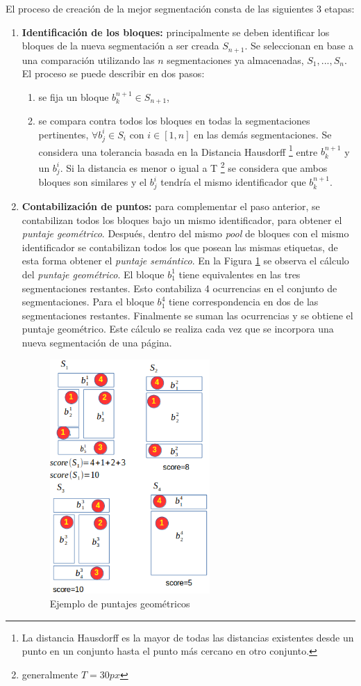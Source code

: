 \documentclass[10pt]{revecom}
\begin{document}
El proceso de creación de la mejor segmentación consta de las siguientes 3 etapas: 
\begin{enumerate}
\item \textbf{Identificación de los bloques:} principalmente se deben identificar los bloques de la nueva segmentación a ser creada $S_{n+1}$. Se seleccionan en base a una comparación utilizando las $n$ segmentaciones ya almacenadas, $S_{1},...,S_{n} $. 
El proceso se puede describir en dos pasos: 
\begin{enumerate}
\item se fija un bloque $b_{k}^{n+1} \in S_{n+1}$, 
\item se compara contra todos los bloques en todas la segmentaciones pertinentes, $\forall b_{j}^{i} \in S_i$ con $i \in [1,n]$ en las demás segmentaciones. 
Se considera una tolerancia basada en la Distancia Hausdorff \footnote{La distancia Hausdorff es la mayor de todas las distancias existentes desde un punto en un conjunto hasta el punto más cercano en otro conjunto.} entre $b_{k}^{n+1}$ y un $b_{j}^{i} $. 
Si la distancia es menor o igual a T \footnote{generalmente $T=30px$} se considera que ambos bloques son similares y el $b_{j}^{i}$  tendría el mismo identificador que $b_{k}^{n+1}$.  
 \end{enumerate}
\item \textbf{Contabilización de puntos:} para complementar el paso anterior, se contabilizan todos los bloques bajo un mismo identificador, para obtener el \textit{puntaje geométrico}. Después, dentro del mismo \textit{pool} de bloques con el mismo identificador se contabilizan todos los que posean las mismas etiquetas, de esta forma obtener el \textit{puntaje semántico}. 
En la Figura \ref{fig:geom} se observa el cálculo del \textit{puntaje geométrico}. El bloque $b_{1}^{1}$ tiene equivalentes en las tres segmentaciones restantes. 
Esto contabiliza 4 ocurrencias en el conjunto de segmentaciones.
Para el bloque $b_{1}^{4}$ tiene correspondencia en dos de las segmentaciones restantes.
Finalmente se suman las ocurrencias y se obtiene el puntaje geométrico.
Este cálculo se realiza cada vez que se incorpora una nueva segmentación de una página.

\begin{figure}[!h]
\centering
\includegraphics[width=230px]{mob-best.png}
\centering\caption{Ejemplo de puntajes geométricos}
\label{fig:geom}
\end{figure}


\end{enumerate}
\end{document}
